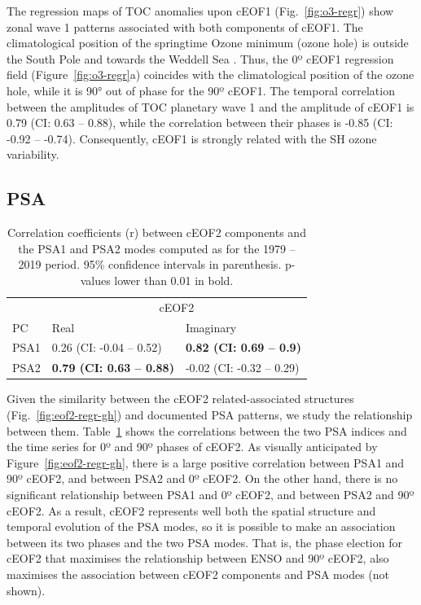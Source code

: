 \documentclass[pdflatex,sn-basic]{sn-jnl}
\theoremstyle{thmstyleone}%
\theoremstyle{thmstyletwo}%
\theoremstyle{thmstylethree}%
\begin{document}
The regression maps of TOC anomalies upon cEOF1 (Fig.~\ref{fig:o3-regr}) show zonal wave 1 patterns associated with both components of cEOF1.
The climatological position of the springtime Ozone minimum (ozone hole) is outside the South Pole and towards the Weddell Sea \citep[e.g.][]{grytsai2011}.
Thus, the 0º cEOF1 regression field (Figure~\ref{fig:o3-regr}a) coincides with the climatological position of the ozone hole, while it is 90° out of phase for the 90º cEOF1.
The temporal correlation between the amplitudes of TOC planetary wave 1 and the amplitude of cEOF1 is 0.79 (CI: 0.63 -- 0.88), while the correlation between their phases is -0.85 (CI: -0.92 -- -0.74).
Consequently, cEOF1 is strongly related with the SH ozone variability.

\hypertarget{psa}{%
\subsection{PSA}\label{psa}}



\begin{table}

\caption{\label{tab:psa-eof2}Correlation coefficients (r) between cEOF2 components and the PSA1 and PSA2 modes computed as \citet{mo2001} for the 1979 -- 2019 period. 95\% confidence intervals in parenthesis. p-values lower than 0.01 in bold.}
\centering
\begin{tabular}[t]{l>{}l>{}l}
\toprule
\multicolumn{1}{c}{} & \multicolumn{2}{c}{cEOF2} \\
\cmidrule(l{3pt}r{3pt}){2-3}
PC & Real & Imaginary\\
\midrule
PSA1 & 0.26 (CI: -0.04 -- 0.52) & \textbf{0.82 (CI: 0.69 -- 0.9)}\\
PSA2 & \textbf{0.79 (CI: 0.63 -- 0.88)} & -0.02 (CI: -0.32 -- 0.29)\\
\bottomrule
\end{tabular}
\end{table}

Given the similarity between the cEOF2 related-associated structures (Fig.~\ref{fig:eof2-regr-gh}) and documented PSA patterns, we study the relationship between them.
Table~\ref{tab:psa-eof2} shows the correlations between the two PSA indices and the time series for 0º and 90º phases of cEOF2.
As visually anticipated by Figure~\ref{fig:eof2-regr-gh}, there is a large positive correlation between PSA1 and 90º cEOF2, and between PSA2 and 0º cEOF2.
On the other hand, there is no significant relationship between PSA1 and 0º cEOF2, and between PSA2 and 90º cEOF2.
As a result, cEOF2 represents well both the spatial structure and temporal evolution of the PSA modes, so it is possible to make an association between its two phases and the two PSA modes.
That is, the phase election for cEOF2 that maximises the relationship between ENSO and 90º cEOF2, also maximises the association between cEOF2 components and PSA modes (not shown).
\end{document}
